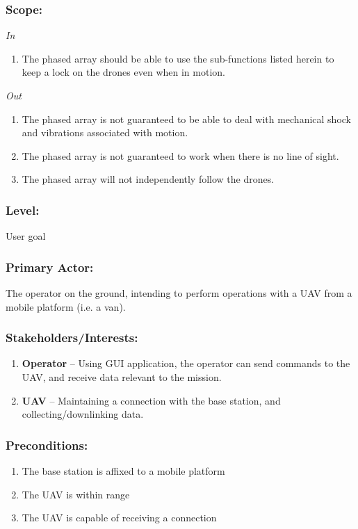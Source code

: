 \documentclass[ProductRequirements.tex]{subfiles}
\begin{document}
	\subsubsection*{Scope:}
	\textit{In}
		\begin{enumerate}
			\item The phased array should be able to use the sub-functions listed herein to keep a lock on the drones even when in motion.
		\end{enumerate}
	\textit{Out}
		\begin{enumerate}
			\item The phased array is not guaranteed to be able to deal with mechanical shock and vibrations associated with motion.
			\item The phased array is not guaranteed to work when there is no line of sight.
			\item The phased array will not independently follow the drones.
		\end{enumerate}
	\subsubsection*{Level:}
	User goal
	\subsubsection*{Primary Actor:}
	The operator on the ground, intending to perform operations with a UAV from a mobile platform (i.e. a van).
	\subsubsection*{Stakeholders/Interests:}
	\begin{enumerate}\itemsep1pt
		\item \textbf{Operator} -- Using GUI application, the operator can send commands to the UAV, and receive data relevant to the mission. 
		\item \textbf{UAV} -- Maintaining a connection with the base station, and collecting/downlinking data. 
	\end{enumerate}
	\subsubsection*{Preconditions:}
	\begin{enumerate}\itemsep1pt
		\item The base station is affixed to a mobile platform
		\item The UAV is within range
		\item The UAV is capable of receiving a connection
	\end{enumerate}
\end{document}
